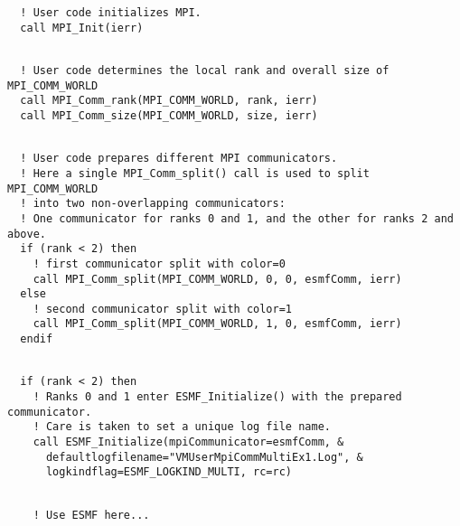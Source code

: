 
 \begin{verbatim}
  ! User code initializes MPI.
  call MPI_Init(ierr)
 
\end{verbatim}
 

 \begin{verbatim}
  ! User code determines the local rank and overall size of MPI_COMM_WORLD
  call MPI_Comm_rank(MPI_COMM_WORLD, rank, ierr)
  call MPI_Comm_size(MPI_COMM_WORLD, size, ierr)
 
\end{verbatim}
 

 \begin{verbatim}
  ! User code prepares different MPI communicators.
  ! Here a single MPI_Comm_split() call is used to split MPI_COMM_WORLD
  ! into two non-overlapping communicators:
  ! One communicator for ranks 0 and 1, and the other for ranks 2 and above.
  if (rank < 2) then
    ! first communicator split with color=0
    call MPI_Comm_split(MPI_COMM_WORLD, 0, 0, esmfComm, ierr)
  else
    ! second communicator split with color=1
    call MPI_Comm_split(MPI_COMM_WORLD, 1, 0, esmfComm, ierr)
  endif
 
\end{verbatim}
 

 \begin{verbatim}
  if (rank < 2) then
    ! Ranks 0 and 1 enter ESMF_Initialize() with the prepared communicator.
    ! Care is taken to set a unique log file name.
    call ESMF_Initialize(mpiCommunicator=esmfComm, &
      defaultlogfilename="VMUserMpiCommMultiEx1.Log", &
      logkindflag=ESMF_LOGKIND_MULTI, rc=rc)
 
\end{verbatim}
 

 \begin{verbatim}
    ! Use ESMF here...
 
\end{verbatim}
 

